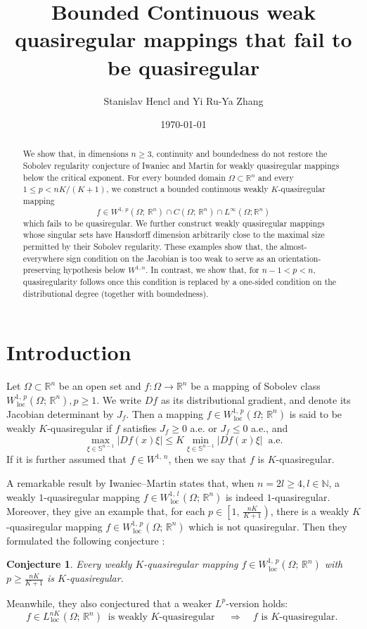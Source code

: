 \documentclass[reqno,11pt]{amsart}
\title[Bounded weak quasiregular mappings that fail to be quasiregular]{Bounded Continuous weak quasiregular mappings that fail to be quasiregular}
\author{Stanislav Hencl and Yi Ru-Ya Zhang}
\date{\today}
\def\loc{{\mathop\mathrm{\,loc\,}}}
\newtheorem{conj}[thm]{Conjecture}
\numberwithin{equation}{section}
\theoremstyle{remark}
\begin{document}
\begin{abstract}
We show that, in dimensions $n\geq 3$, continuity and boundedness do not
restore the Sobolev regularity conjecture of Iwaniec and Martin for weakly
quasiregular mappings below the critical exponent. For every bounded domain
$\Omega\subset\mathbb R^n$ and every $1\leq p<nK/(K+1)$, we construct a
bounded continuous weakly $K$-quasiregular mapping
$$
    f\in W^{1,\,p}(\Omega;\,\mathbb R^n)\cap C(\Omega;\,\mathbb R^n)
   \cap L^\infty(\Omega;\mathbb R^n)
$$
which fails to be quasiregular. We further construct weakly quasiregular
mappings whose singular sets have Hausdorff dimension arbitrarily close to the
maximal size permitted by their Sobolev regularity. These examples show 
that, the almost-everywhere sign condition on the Jacobian is too weak to serve as an orientation-preserving hypothesis below $W^{1,n}$. In contrast, we show that, for $n-1<p<n$, quasiregularity follows once this condition is replaced by a one-sided condition on the distributional degree (together with boundedness).
\end{abstract}
 
\maketitle
\section{Introduction}
Let $\Omega\subset \mathbb R^n$ be an open set and $f\colon\Omega\to \mathbb R^n$ be a mapping of Sobolev class $W^{1,\,p}_{\loc}(\Omega;\,\mathbb R^n), p\ge 1$. We write $Df$ as its distributional gradient, and denote its Jacobian determinant by $J_f$. 
Then a mapping $f\in W^{1,\,p}_{\loc}(\Omega;\,\mathbb R^n)$ is said to be weakly $K$-quasiregular if $f$ satisfies
$J_f\ge 0 $ a.e. or $J_f\le 0$ a.e., and
$$\max_{\xi\in \mathbb S^{n-1}} |Df(x)\xi|\le K \min_{\xi\in \mathbb S^{n-1}} |Df(x)\xi| \ \text{ a.e.}$$
If it is further assumed that $f\in W^{1,\,n}$, then we say that $f$ is $K$-quasiregular. 


A remarkable result by Iwaniec--Martin \cite[Theorem 1]{IM1993} states that, when $n=2l\ge 4, l\in\mathbb N$, a weakly $1$-quasiregular mapping $f\in W^{1,\,l}_{\loc}(\Omega;\,\mathbb R^n)$ is indeed $1$-quasiregular. Moreover, they give an example that, for each $p\in \left[1,\,\frac{nK}{K+1}\right)$, there is a weakly $K$-quasiregular mapping $f\in W^{1,\,p}_{\loc}(\Omega;\,\mathbb R^n)$ which is not quasiregular. 
Then they formulated the following conjecture \cite[Conjecture 12.9]{IM1993}: 
\begin{conj}
    Every weakly $K$-quasiregular mapping $f\in W^{1,\,p}_{\loc}(\Omega;\,\mathbb R^n)$ with $p\ge \frac{nK}{K+1}$ is $K$-quasiregular. 
\end{conj}
Meanwhile, they also  conjectured that a weaker $L^p$-version holds:
\begin{equation}\label{weak IM}
    f\in L^{nK}_{\loc}(\Omega;\,\mathbb R^n) \  \text{ is weakly $K$-quasiregular } \quad \Longrightarrow \quad  f \text{ is  $K$-quasiregular. }
\end{equation}
 
\end{document}
